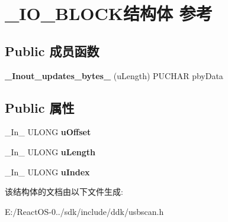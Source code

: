 \hypertarget{struct___i_o___b_l_o_c_k}{}\section{\+\_\+\+I\+O\+\_\+\+B\+L\+O\+C\+K结构体 参考}
\label{struct___i_o___b_l_o_c_k}
\subsection*{Public 成员函数}
\begin{DoxyCompactItemize}
\item 
\mbox{\label{struct___i_o___b_l_o_c_k_a40f59cc5e2447552ca08c5f26c651f03}} 
{\bfseries \+\_\+\+Inout\+\_\+updates\+\_\+bytes\+\_\+} (u\+Length) P\+U\+C\+H\+AR pby\+Data
\end{DoxyCompactItemize}
\subsection*{Public 属性}
\begin{DoxyCompactItemize}
\item 
\mbox{\label{struct___i_o___b_l_o_c_k_a1c7298dbbfb9464327014e6b2b9b6344}} 
\+\_\+\+In\+\_\+ U\+L\+O\+NG {\bfseries u\+Offset}
\item 
\mbox{\label{struct___i_o___b_l_o_c_k_aabaa3f07d463ef2145cac7df45a2b5cf}} 
\+\_\+\+In\+\_\+ U\+L\+O\+NG {\bfseries u\+Length}
\item 
\mbox{\label{struct___i_o___b_l_o_c_k_a0a31644c7abb23b17479862b7f875986}} 
\+\_\+\+In\+\_\+ U\+L\+O\+NG {\bfseries u\+Index}
\end{DoxyCompactItemize}


该结构体的文档由以下文件生成\+:\begin{DoxyCompactItemize}
\item 
E\+:/\+React\+O\+S-\/0../sdk/include/ddk/usbscan.\+h\end{DoxyCompactItemize}
